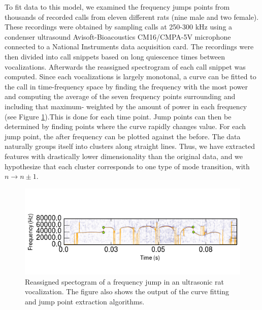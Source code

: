 \documentclass[twocolumn, prl]{revtex4}
\begin{document}
To fit data to this model, we examined the frequency jumps points from thousands of recorded calls from eleven different rats (nine male and two female). These recordings were obtained by sampling calls at 250-300 kHz using a condenser ultrasound Avisoft-Bioacoustics CM16/CMPA-5V microphone connected to a National Instruments data acquisition card. The recordings were then divided into call snippets based on long quiescence times between vocalizations. Afterwards the reassigned spectrogram of each call snippet was computed. Since each vocalizations is largely monotonal, a curve can be fitted to the call in time-frequency space by finding the frequency with the most power and computing the average of the seven frequency points surrounding and including that maximum- weighted by the amount of power in each frequency (see Figure \ref{fig:specgram}).This is done for each time point. Jump points can then be determined by finding points where the curve rapidly changes value. For each jump point, the after frequency can be plotted against the before. The data naturally groups itself into clusters along straight lines. Thus, we have extracted features with drastically lower dimensionality than the original data, and we hypothesize that each cluster corresponds to one type of mode transition, with $n\rightarrow n\pm1$. 
\begin{figure}
\begin{center}
\includegraphics[width=\columnwidth]{specgram.png}
\caption{\label{fig:specgram} Reassigned spectogram of a frequency jump in an ultrasonic rat vocalization. The figure also shows the output of the curve fitting and jump point extraction algorithms.}
\end{center} 
\end{figure}
\end{document}
